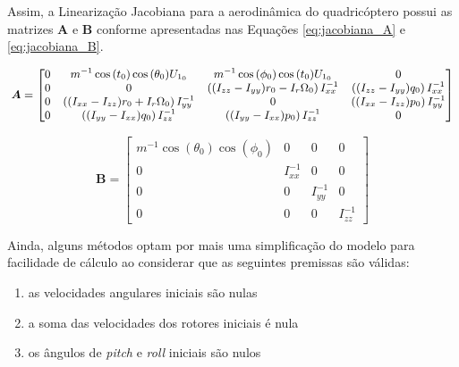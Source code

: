 \documentclass[main.tex]{subfiles}
\begin{document}
\vspace{0.1cm}

Assim, a Linearização Jacobiana para a aerodinâmica do quadricóptero possui as matrizes $\boldsymbol{A}$ e $\boldsymbol{B}$ conforme apresentadas nas Equações \ref{eq:jacobiana_A} e \ref{eq:jacobiana_B}.

\vspace{0.1cm}

\begin{equation}\label{eq:jacobiana_A}
	\small{
	\boldsymbol{A} = \begin{bmatrix}
		0 & m^{-1}\cos{(t_0)}\cos{(\theta_0)}U_{1_0} & m^{-1}\cos{(\phi_0)}\cos{(t_0)}U_{1_0} & 0\\
		
		0 & 0 & \left((I_{zz} - I_{yy})r_0 - I_r\Omega_0\right)I_{xx}^{-1} & \left((I_{zz} - I_{yy})q_0\right)I_{xx}^{-1}\\
		
		0 & \left((I_{xx} - I_{zz})r_0 + I_r\Omega_0\right)I_{yy}^{-1} & 0 & \left((I_{xx} - I_{zz})p_0\right)I_{yy}^{-1}\\
		
		0 & \left((I_{yy} - I_{xx})q_0\right)I_{zz}^{-1} & \left((I_{yy} - I_{xx})p_0\right)I_{zz}^{-1} & 0
	\end{bmatrix}
	}
\end{equation}

\begin{equation}\label{eq:jacobiana_B}
	\boldsymbol{B} = \begin{bmatrix}
		m^{-1}\cos{(\theta_0)}\cos{(\phi_0)} & 0 & 0 & 0\\
		
		0 & I_{xx}^{-1} & 0 & 0\\
		
		0 & 0 & I_{yy}^{-1} & 0\\
		
		0 & 0 & 0 & I_{zz}^{-1}
	\end{bmatrix}
\end{equation}
	
Ainda, alguns métodos optam por mais uma simplificação do modelo para facilidade de cálculo ao considerar que as seguintes premissas são válidas:

\begin{enumerate}
	\item as velocidades angulares iniciais são nulas
	\item a soma das velocidades dos rotores iniciais é nula
	\item os ângulos de \textit{pitch} e \textit{roll} iniciais são nulos
\end{enumerate}
\end{document}
